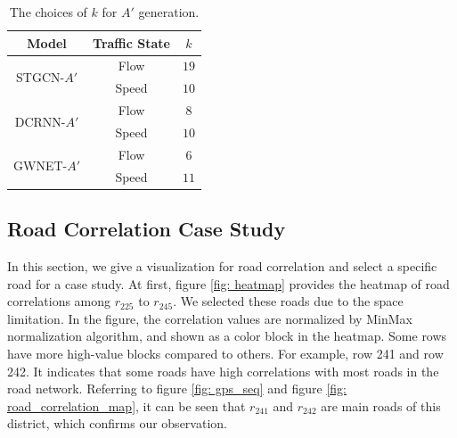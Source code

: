 \begin{table}[htb]
    \renewcommand\arraystretch{1.5} %
    \begin{center}
        \caption{The choices of $k$ for $A'$ generation.}
        \label{k_table}
        \begin{tabular}{c|c|c}
            \toprule

            \textbf{Model}              & \textbf{Traffic State} & \textbf{$k$} \\

            \hline

            \multirow{2}{*}{STGCN-$A'$} & Flow                   & $19$         \\
            \cline{2-3}
            ~                           & Speed                  & $10$         \\

            \hline

            \multirow{2}{*}{DCRNN-$A'$} & Flow                   & $8$          \\
            \cline{2-3}
            ~                           & Speed                  & $10$         \\

            \hline

            \multirow{2}{*}{GWNET-$A'$} & Flow                   & $6$          \\
            \cline{2-3}
            ~                           & Speed                  & $11$         \\

            \bottomrule
        \end{tabular}
    \end{center}
\end{table}

\subsection{Road Correlation Case Study}
In this section, we give a visualization for road correlation and select a specific road for a case study. At first, figure \ref{fig: heatmap} provides the heatmap of road correlations among $r_{225}$ to $r_{245}$. We selected these roads due to the space limitation. In the figure, the correlation values are normalized by MinMax normalization algorithm, and shown as a color block in the heatmap. Some rows have more high-value blocks compared to others. For example, row 241 and row 242. It indicates that some roads have high correlations with most roads in the road network. Referring to figure \ref{fig: gps_seq} and figure \ref{fig: road_correlation_map}, it can be seen that $r_{241}$ and $r_{242}$ are main roads of this district, which confirms our observation.

